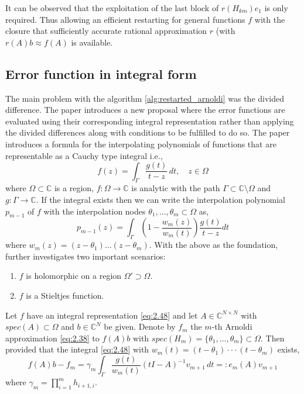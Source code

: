 It can be observed that the exploitation of the last block of $r(H_{km})e_{1}$ is only required. Thus allowing an efficient restarting for general functions $f$ with the closure that sufficiently accurate rational approximation $r$ (with $r(A)b \approx f(A)$ is available.

\subsection{Error function in integral form}
\label{sec:error_func_int_form}

The main problem with the algorithm \ref{alg:restarted_arnoldi} was the divided difference. The paper \cite{52} introduces a new proposal where the error functions are evaluated using their corresponding integral representation rather than applying the divided differences along with conditions to be fulfilled to do so. The paper introduces a formula for the interpolating polynomials of functions that are representable as a Cauchy type integral i.e.,
\begin{equation}
    f(z) = \int_{\Gamma} \frac{g(t)}{t - z} \, dt, \quad z \in \Omega
    \label{eq:2.48}
\end{equation}
where $\Omega \subset \mathbb{C}$ is a region, $f : \Omega \to \mathbb{C}$ is analytic with the path $\Gamma \subset \mathbb{C} \setminus \Omega$ and $g : \Gamma \to \mathbb{C}$. If the integral exists then we can write the interpolation polynomial $p_{m-1}$ of $f$ with the interpolation nodes $\theta_{1},\dots,\theta_{m} \subset \Omega$ as,
\begin{equation}
    p_{m-1}(z) = \int_{\Gamma} \left(1 - \frac{w_{m}(z)}{w_{m}(t)}\right) \frac{g(t)}{t - z}dt
    \label{eq:2.49}
\end{equation}
where $w_{m}(z)=(z-\theta_{1})\dots(z-\theta_{m})$. With the above as the foundation, \cite{52} further investigates two important scenarios:

\begin{enumerate}
    \item $f$ is holomorphic on a region $\Omega' \supset \Omega$.
    \item $f$ is a Stieltjes function.
\end{enumerate}

\begin{theorem}
\label{the:2.19}
    \cite{52} Let $f$ have an integral representation \ref{eq:2.48} and let $A \in \mathbb{C}^{N \times N}$ with $spec(A) \subset \Omega$ and $b \in \mathbb{C}^{N}$ be given. Denote by $f_{m}$ the $m$-th Arnoldi approximation \ref{eq:2.38} to $f(A)b$ with $spec(H_{m}) = \{\theta_{1},\dots,\theta_{m}\} \subset \Omega$. Then provided that the integral \ref{eq:2.48} with $ w_m (t) = (t - \theta_1 ) ··· (t - \theta_m )$ exists,
    \begin{equation}
        f(A)b - f_{m} = \gamma_{m} \int_{\Gamma} \frac{g(t)}{w_{m}(t)} (tI - A)^{-1} v_{m+1} \, dt =: e_{m}(A) v_{m+1}
        \label{eq:2.50}
    \end{equation}
    where $\gamma_{m}=\prod_{i=1}^{m}h_{i+1,i}$.    
\end{theorem}

